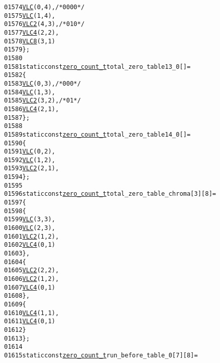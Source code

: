 \begin{footnotesize}
\begin{alltt}
01574         \hyperlink{vlc_8h_a7f3572774a720fd9b4bc3b1a0b65082f}{VLC}(0, 4), \textcolor{comment}{/* 0000 */}
01575         \hyperlink{vlc_8h_a7f3572774a720fd9b4bc3b1a0b65082f}{VLC}(1, 4),
01576         \hyperlink{vlc_8h_ad3cda36b9c6132357c7f7de5e52a6c93}{VLC2}(4, 3), \textcolor{comment}{/* 010 */}
01577         \hyperlink{vlc_8h_a02cdc921d8f03450b12879e8afb222cb}{VLC4}(2, 2),
01578         \hyperlink{vlc_8h_a0a94088f44f593387fb86112a6c7da9c}{VLC8}(3, 1)
01579 \};
01580 
01581 \textcolor{keyword}{static} \textcolor{keyword}{const} \hyperlink{structzero__count__t}{zero_count_t} total\_zero\_table13\_0[] = 
01582 \{
01583         \hyperlink{vlc_8h_a7f3572774a720fd9b4bc3b1a0b65082f}{VLC}(0, 3), \textcolor{comment}{/* 000 */}
01584         \hyperlink{vlc_8h_a7f3572774a720fd9b4bc3b1a0b65082f}{VLC}(1, 3),
01585         \hyperlink{vlc_8h_ad3cda36b9c6132357c7f7de5e52a6c93}{VLC2}(3, 2), \textcolor{comment}{/* 01 */}
01586         \hyperlink{vlc_8h_a02cdc921d8f03450b12879e8afb222cb}{VLC4}(2, 1),
01587 \};
01588 
01589 \textcolor{keyword}{static} \textcolor{keyword}{const} \hyperlink{structzero__count__t}{zero_count_t} total\_zero\_table14\_0[] = 
01590 \{
01591         \hyperlink{vlc_8h_a7f3572774a720fd9b4bc3b1a0b65082f}{VLC}(0, 2), 
01592         \hyperlink{vlc_8h_a7f3572774a720fd9b4bc3b1a0b65082f}{VLC}(1, 2),
01593         \hyperlink{vlc_8h_ad3cda36b9c6132357c7f7de5e52a6c93}{VLC2}(2, 1),
01594 \};
01595 
01596 \textcolor{keyword}{static} \textcolor{keyword}{const} \hyperlink{structzero__count__t}{zero_count_t} total\_zero\_table\_chroma[3][8] = 
01597 \{
01598         \{
01599                 \hyperlink{vlc_8h_a7f3572774a720fd9b4bc3b1a0b65082f}{VLC}(3, 3), 
01600                         \hyperlink{vlc_8h_a7f3572774a720fd9b4bc3b1a0b65082f}{VLC}(2, 3),
01601                         \hyperlink{vlc_8h_ad3cda36b9c6132357c7f7de5e52a6c93}{VLC2}(1, 2),
01602                         \hyperlink{vlc_8h_a02cdc921d8f03450b12879e8afb222cb}{VLC4}(0, 1)
01603         \},
01604         \{
01605                 \hyperlink{vlc_8h_ad3cda36b9c6132357c7f7de5e52a6c93}{VLC2}(2, 2),
01606                         \hyperlink{vlc_8h_ad3cda36b9c6132357c7f7de5e52a6c93}{VLC2}(1, 2),
01607                         \hyperlink{vlc_8h_a02cdc921d8f03450b12879e8afb222cb}{VLC4}(0, 1)
01608                 \},
01609                 \{
01610                         \hyperlink{vlc_8h_a02cdc921d8f03450b12879e8afb222cb}{VLC4}(1, 1),
01611                                 \hyperlink{vlc_8h_a02cdc921d8f03450b12879e8afb222cb}{VLC4}(0, 1)
01612                 \}
01613 \};
01614 
01615 \textcolor{keyword}{static} \textcolor{keyword}{const} \hyperlink{structzero__count__t}{zero_count_t} run\_before\_table\_0[7][8] = 

\end{alltt}
\end{footnotesize}
